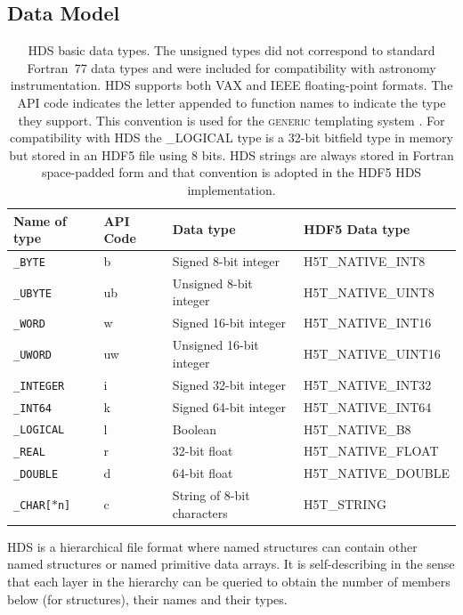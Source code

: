 \documentclass[final,authoryear,5p,times,twocolumn]{elsarticle}
\begin{document}
\subsection{Data Model}

\begin{table}[!ht]
\caption{HDS basic data types. The unsigned types did not correspond
  to standard Fortran~77 data types and were included for
  compatibility with astronomy instrumentation. HDS supports both VAX
  and IEEE floating-point formats. The API code indicates the letter appended
  to function names to indicate the type they support. This convention is
  used for the \textsc{generic} templating system \citep{SUN7}. For
  compatibility with HDS the \_LOGICAL type is a 32-bit bitfield type
  in memory but stored in an HDF5 file using 8 bits. HDS strings are
  always stored in Fortran space-padded form and that convention is
  adopted in the HDF5 HDS implementation.}
\label{tab:hdstypes}
\begin{center}
\begin{tabular}{llll}
\hline
Name of type & API Code & Data type & HDF5 Data type  \\ \hline
\texttt{\_BYTE} & b & Signed 8-bit integer & H5T\_NATIVE\_INT8 \\
\texttt{\_UBYTE} & ub & Unsigned 8-bit integer & H5T\_NATIVE\_UINT8\\
\texttt{\_WORD} & w & Signed 16-bit integer &   H5T\_NATIVE\_INT16\\
\texttt{\_UWORD} & uw & Unsigned 16-bit integer &  H5T\_NATIVE\_UINT16 \\
\texttt{\_INTEGER} & i & Signed 32-bit integer &  H5T\_NATIVE\_INT32 \\
\texttt{\_INT64} & k &Signed 64-bit integer & H5T\_NATIVE\_INT64 \\
\texttt{\_LOGICAL} & l & Boolean & H5T\_NATIVE\_B8 \\
\texttt{\_REAL} & r & 32-bit float & H5T\_NATIVE\_FLOAT \\
\texttt{\_DOUBLE} & d & 64-bit float & H5T\_NATIVE\_DOUBLE \\
\texttt{\_CHAR[$*$n]} & c & String of 8-bit characters  & H5T\_STRING\\
\hline
\end{tabular}
\end{center}
\end{table}


HDS is a hierarchical file format where named structures can contain
other named structures or named primitive data arrays. It is
self-describing in the sense that each layer in the hierarchy can be
queried to obtain the number of members below (for structures), their
names and their types.
\end{document}
